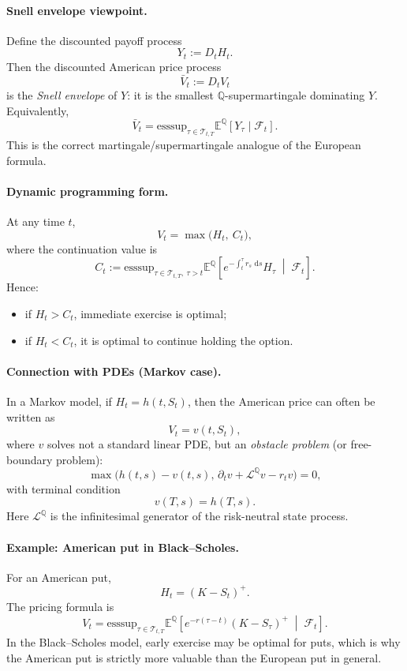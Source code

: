 \documentclass[11pt]{article}
\newcommand{\Qbb}{\mathbb{Q}}
\newcommand{\E}{\mathbb{E}}
\newcommand{\dd}{\,\mathrm{d}}
\newcommand{\1}{\mathbf{1}}
\begin{document}
\paragraph{Snell envelope viewpoint.}
Define the discounted payoff process
\[
Y_t:=D_tH_t.
\]
Then the discounted American price process
\[
\bar V_t:=D_tV_t
\]
is the \emph{Snell envelope} of \(Y\): it is the smallest \(\Qbb\)-supermartingale dominating \(Y\).
Equivalently,
\[
\bar V_t
=
\text{esssup}_{\tau\in\mathcal T_{t,T}}
\E^{\Qbb}[Y_\tau\mid\mathcal F_t].
\]
This is the correct martingale/supermartingale analogue of the European formula.

\paragraph{Dynamic programming form.}
At any time \(t\),
\[
V_t=\max\big(H_t,\ C_t\big),
\]
where the continuation value is
\[
C_t
:=
\text{esssup}_{\tau\in\mathcal T_{t,T},\ \tau>t}
\E^{\Qbb}\!\left[
e^{-\int_t^\tau r_s\,\dd s}H_\tau
\;\middle|\;
\mathcal F_t
\right].
\]
Hence:
\begin{itemize}[leftmargin=1.4em]
    \item if \(H_t>C_t\), immediate exercise is optimal;
    \item if \(H_t<C_t\), it is optimal to continue holding the option.
\end{itemize}

\paragraph{Connection with PDEs (Markov case).}
In a Markov model, if \(H_t=h(t,S_t)\), then the American price can often be written as
\[
V_t=v(t,S_t),
\]
where \(v\) solves not a standard linear PDE, but an \emph{obstacle problem} (or free-boundary problem):
\[
\max\Big(
h(t,s)-v(t,s),\,
\partial_t v + \mathcal L^{\Qbb} v - r_t v
\Big)=0,
\]
with terminal condition
\[
v(T,s)=h(T,s).
\]
Here \(\mathcal L^{\Qbb}\) is the infinitesimal generator of the risk-neutral state process.

\paragraph{Example: American put in Black--Scholes.}
For an American put,
\[
H_t=(K-S_t)^+.
\]
The pricing formula is
\[
V_t
=
\text{esssup}_{\tau\in\mathcal T_{t,T}}
\E^{\Qbb}\!\left[
e^{-r(\tau-t)}(K-S_\tau)^+
\;\middle|\;
\mathcal F_t
\right].
\]
In the Black--Scholes model, early exercise may be optimal for puts, which is why the American put is strictly more valuable than the European put in general.
\end{document}

